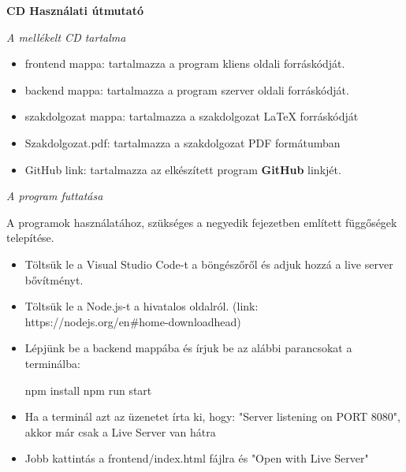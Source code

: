 \pagestyle{empty}

\noindent \textbf{\Large CD Használati útmutató}

\vskip 1cm

\textit{A mellékelt CD tartalma}
\begin{itemize}
\item frontend mappa: tartalmazza a program kliens oldali forráskódját.
\item backend mappa: tartalmazza a program szerver oldali forráskódját.
\item szakdolgozat mappa: tartalmazza a szakdolgozat \LaTeX{} forráskódját
\item Szakdolgozat.pdf: tartalmazza a szakdolgozat PDF formátumban
\item GitHub link: tartalmazza az elkészített program \textbf{GitHub} linkjét.
\end{itemize}

\vskip 1cm

\textit{A program futtatása}

A programok használatához, szükséges a negyedik fejezetben említett függőségek telepítése. 

\begin{itemize}
\item Töltsük le a Visual Studio Code-t a böngészőről és adjuk hozzá a live server bővítményt.
\item Töltsük le a Node.js-t a hivatalos oldalról. (link: https://nodejs.org/en\#home-downloadhead)
\item Lépjünk be a backend mappába és írjuk be az alábbi parancsokat a terminálba:
\begin{cpp}
 npm install
 npm run start
\end{cpp}
\item Ha a terminál azt az üzenetet írta ki, hogy: "Server listening on PORT 8080", akkor már csak a Live Server van hátra
\item Jobb kattintás a frontend/index.html fájlra és "Open with Live Server"
\end{itemize}
